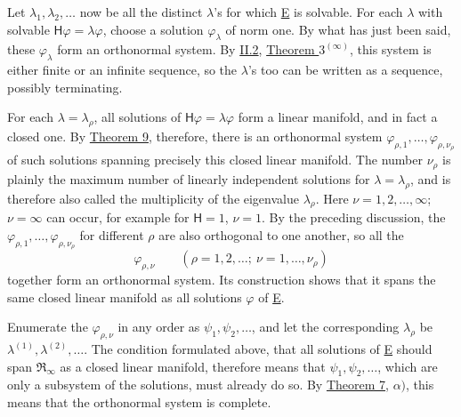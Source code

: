 \documentclass[fontsize=13pt,twoside,openany,headings=normal,parskip=false,bookmarkpackage=false,DIV=calc]{scrbook}
\begin{document}
Let $\lambda_1,\lambda_2,\ldots$ now be all the distinct $\lambda$'s for which \hyperref[eq:II.6.E]{E} is solvable. For each $\lambda$ with solvable $\mathsf H\varphi=\lambda\varphi$, choose a solution $\varphi_\lambda$ of norm one. By what has just been said, these $\varphi_\lambda$ form an orthonormal system. By \hyperref[sec:II.2]{II.2}, \hyperref[thm:II.3infty]{Theorem $3^{(\infty)}$}, this system is either finite or an infinite sequence, so the $\lambda$'s too can be written as a sequence, possibly terminating.

\hypertarget{origpage-55}{}%
For each $\lambda=\lambda_\rho$, all solutions of $\mathsf H\varphi=\lambda\varphi$ form a linear manifold, and in fact a closed one. By \hyperref[thm:II.9]{Theorem 9}, therefore, there is an orthonormal system $\varphi_{\rho,1},\ldots,\varphi_{\rho,\nu_\rho}$ of such solutions spanning precisely this closed linear manifold. The number $\nu_\rho$ is plainly the maximum number of linearly independent solutions for $\lambda=\lambda_\rho$, and is therefore also called the multiplicity of the eigenvalue $\lambda_\rho$. Here $\nu=1,2,\ldots,\infty$; $\nu=\infty$ can occur, for example for $\mathsf H=1$, $\nu=1$. By the preceding discussion, the $\varphi_{\rho,1},\ldots,\varphi_{\rho,\nu_\rho}$ for different $\rho$ are also orthogonal to one another, so all the
\[
\varphi_{\rho,\nu}\qquad(\rho=1,2,\ldots;\ \nu=1,\ldots,\nu_\rho)
\]
together form an orthonormal system. Its construction shows that it spans the same closed linear manifold as all solutions $\varphi$ of \hyperref[eq:II.6.E]{E}.

Enumerate the $\varphi_{\rho,\nu}$ in any order as $\psi_1,\psi_2,\ldots$, and let the corresponding $\lambda_\rho$ be $\lambda^{(1)},\lambda^{(2)},\ldots$. The condition formulated above, that all solutions of \hyperref[eq:II.6.E]{E} should span $\mathfrak{R}_\infty$ as a closed linear manifold, therefore means that $\psi_1,\psi_2,\ldots$, which are only a subsystem of the solutions, must already do so. By \hyperref[thm:II.7]{Theorem 7}, $\alpha)$, this means that the orthonormal system is complete.
\end{document}
